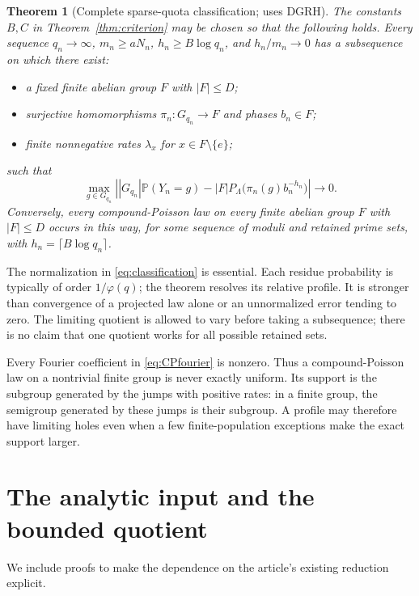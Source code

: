\documentclass[11pt]{article}
\newtheorem{theorem}{Theorem}[section]
\theoremstyle{remark}\newtheorem{remark}[theorem]{Remark}
\newcommand{\Pp}{\mathbb P}
\newcommand{\abs}[1]{\left|#1\right|}
\begin{document}
\begin{theorem}[Complete sparse-quota classification; uses DGRH]\label{thm:classification}
The constants $B,C$ in Theorem~\ref{thm:criterion} may be chosen so that the following holds. Every sequence $q_n\to\infty$, $m_n\ge aN_n$, $h_n\ge B\log q_n$, and $h_n/m_n\to0$ has a subsequence on which there exist:
\begin{itemize}
\item a fixed finite abelian group $F$ with $|F|\le D$;
\item surjective homomorphisms $\pi_n:G_{q_n}\to F$ and phases $b_n\in F$;
\item finite nonnegative rates $\lambda_x$ for $x\in F\setminus\{e\}$;
\end{itemize}
such that
\begin{equation}\label{eq:classification}
 \max_{g\in G_{q_n}}
 \abs{|G_{q_n}|\Pp(Y_n=g)
       -|F|P_\Lambda\bigl(\pi_n(g)b_n^{-h_n}\bigr)}\longrightarrow0.
\end{equation}
Conversely, every compound-Poisson law on every finite abelian group $F$ with $|F|\le D$ occurs in this way, for some sequence of moduli and retained prime sets, with $h_n=\lceil B\log q_n\rceil$.
\end{theorem}

The normalization in \eqref{eq:classification} is essential. Each residue probability is typically of order $1/\varphi(q)$; the theorem resolves its relative profile. It is stronger than convergence of a projected law alone or an unnormalized error tending to zero. The limiting quotient is allowed to vary before taking a subsequence; there is no claim that one quotient works for all possible retained sets.

Every Fourier coefficient in \eqref{eq:CPfourier} is nonzero. Thus a compound-Poisson law on a nontrivial finite group is never exactly uniform. Its support is the subgroup generated by the jumps with positive rates: in a finite group, the semigroup generated by these jumps is their subgroup. A profile may therefore have limiting holes even when a few finite-population exceptions make the exact support larger.

\section{The analytic input and the bounded quotient}\label{sec:quotient}

We include proofs to make the dependence on the article's existing reduction explicit.
\end{document}
